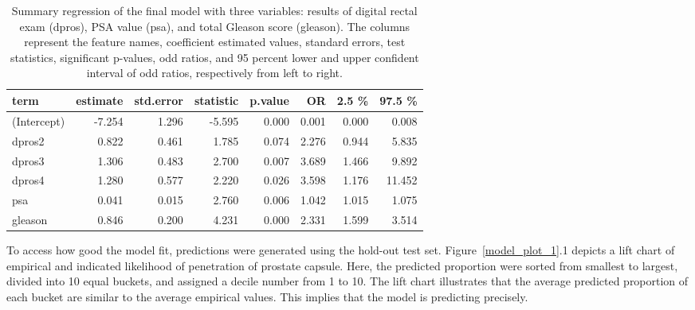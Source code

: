 \documentclass[11pt]{article}\usepackage[]{graphicx}\usepackage[]{color}
\begin{document}
\begin{center}
\begin{table}[ht]
\centering
\begin{tabular}{lrrrrrrr}
  \hline
term & estimate & std.error & statistic & p.value & OR & 2.5 \% & 97.5 \% \\ 
  \hline
(Intercept) & -7.254 & 1.296 & -5.595 & 0.000 & 0.001 & 0.000 & 0.008 \\ 
  dpros2 & 0.822 & 0.461 & 1.785 & 0.074 & 2.276 & 0.944 & 5.835 \\ 
  dpros3 & 1.306 & 0.483 & 2.700 & 0.007 & 3.689 & 1.466 & 9.892 \\ 
  dpros4 & 1.280 & 0.577 & 2.220 & 0.026 & 3.598 & 1.176 & 11.452 \\ 
  psa & 0.041 & 0.015 & 2.760 & 0.006 & 1.042 & 1.015 & 1.075 \\ 
  gleason & 0.846 & 0.200 & 4.231 & 0.000 & 2.331 & 1.599 & 3.514 \\ 
   \hline
\end{tabular}
\caption{Summary regression of the final model with three variables: results of digital rectal exam (dpros), PSA value (psa), and total Gleason score (gleason). The columns represent the feature names, coefficient estimated values, standard errors, test statistics, significant p-values, odd ratios, and 95 percent lower and upper confident interval of odd ratios, respectively from left to right.} 
\label{reg_summary_final}
\end{table}

\end{center}

\noindent To access how good the model fit, predictions were generated using the hold-out test set. Figure~\ref{model_plot_1}.1 depicts a lift chart of empirical and indicated likelihood of penetration of prostate capsule. Here, the predicted proportion were sorted from smallest to largest, divided into 10 equal buckets, and assigned a decile number from 1 to 10. The lift chart illustrates that the average predicted proportion of each bucket are similar to the average empirical values. This implies that the model is predicting precisely.  
\end{document}
